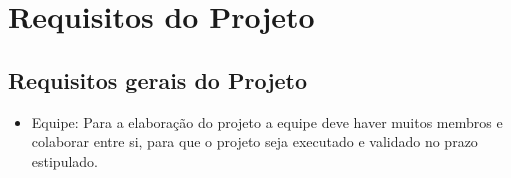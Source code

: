 \chapter{Requisitos do Projeto}

\section{Requisitos gerais do Projeto}

\begin{itemize}
\item Equipe: Para a elaboração do projeto a equipe deve haver muitos membros e colaborar entre si, para que o projeto seja executado e validado no prazo estipulado.
\end{itemize}
